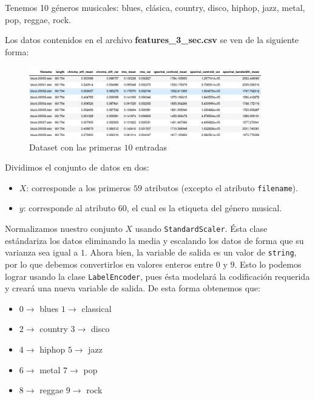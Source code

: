 \documentclass[letterpaper,11pt]{article}
\begin{document}
Tenemos 10 géneros musicales: blues, clásica, country, disco, hiphop, jazz,
metal, pop, reggae, rock.

Los datos contenidos en el archivo \textbf{features\_3\_sec.csv} se ven de la 
siguiente forma: 
\begin{figure}[h!]
    \centering
    \includegraphics[width=0.9\textwidth]{imagenes/dataset.png}
    \caption{Dataset con las primeras $10$ entradas}
    \label{fig: dataframe1}
\end{figure}

Dividimos el conjunto de datos en dos:
\begin{itemize}
    \item $X$: corresponde a los primeros $59$ atributos (excepto el atributo 
    \texttt{filename}).
    
    \item $y$: corresponde al atributo $60$, el cual es la etiqueta del género 
    musical.
\end{itemize}

Normalizamos nuestro conjunto $X$ usando \texttt{StandardScaler}. Ésta clase 
estándariza los datos eliminando la media y escalando los datos de forma que 
su varianza sea igual a $1$. Ahora bien, la variable de salida es un valor de 
\texttt{string}, por lo que debemos convertirlos en valores enteros entre $0$ 
y $9$. Esto lo podemos lograr usando la clase \texttt{LabelEncoder}, pues ésta 
modelará la codificación requerida y creará una nueva variable de salida. De 
esta forma obtenemos que:
\begin{itemize}
    \item $0 \rightarrow$ blues \quad \quad \; $1 \rightarrow$ classical
    \item $2 \rightarrow$ country \quad \; $3 \rightarrow$ disco
    \item $4 \rightarrow$ hiphop \quad \quad $5 \rightarrow$ jazz 
    \item $6 \rightarrow$ metal \quad \quad \; $7 \rightarrow$ pop 
    \item $8 \rightarrow$ reggae \quad \quad $9 \rightarrow$ rock
\end{itemize}
\end{document}
